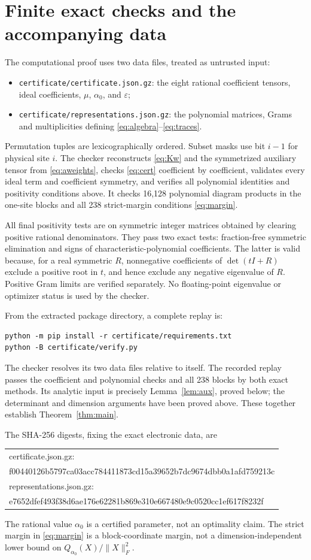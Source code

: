 \documentclass[10pt]{article}
\newcommand{\al}{\alpha_0}
\newcommand{\eps}{\varepsilon}
\begin{document}
\section{Finite exact checks and the accompanying data}
The computational proof uses two data files, treated as untrusted input:
\begin{itemize}
\item \texttt{certificate/certificate.json.gz}: the eight rational
coefficient tensors, ideal coefficients, $\mu$, $\al$, and $\eps$;
\item \texttt{certificate/representations.json.gz}: the polynomial matrices,
Grams and multiplicities defining \eqref{eq:algebra}--\eqref{eq:traces}.
\end{itemize}
Permutation tuples are lexicographically ordered. Subset masks use bit $i-1$
for physical site $i$. The checker reconstructs \eqref{eq:Kw} and the
symmetrized auxiliary tensor from \eqref{eq:aweights}, checks
\eqref{eq:cert} coefficient by coefficient, validates every ideal term and
coefficient symmetry, and verifies all polynomial identities and positivity
conditions above. It checks 16,128 polynomial diagram products in the
one-site blocks and all 238 strict-margin conditions \eqref{eq:margin}.

All final positivity tests are on symmetric integer matrices obtained by
clearing positive rational denominators. They pass two exact tests:
fraction-free symmetric elimination and signs of characteristic-polynomial
coefficients. The latter is valid because, for a real symmetric $R$,
nonnegative coefficients of $\det(tI+R)$ exclude a positive root in $t$,
and hence exclude any negative eigenvalue of $R$. Positive Gram limits are
verified separately. No floating-point eigenvalue or optimizer status is
used by the checker.

From the extracted package directory, a complete replay is:
\begin{verbatim}
python -m pip install -r certificate/requirements.txt
python -B certificate/verify.py
\end{verbatim}
The checker resolves its two data files relative to itself. The recorded
replay passes the coefficient and polynomial checks and all 238 blocks by
both exact methods. Its analytic input is precisely
Lemma~\ref{lem:aux}, proved below; the determinant and dimension arguments
have been proved above. These together establish Theorem~\ref{thm:main}.

The SHA-256 digests, fixing the exact electronic data, are
\begin{center}\small\ttfamily
\begin{tabular}{@{}l@{}}
certificate.json.gz:\\
f00440126b5797ca03acc784411873cd15a39652b7dc9674dbb0a1afd759213c\\[3pt]
representations.json.gz:\\
e7652dfef493f38d6ae176e62281b869e310e667480e9c0520cc1ef617f8232f
\end{tabular}
\end{center}
The rational value $\al$ is a certified parameter, not an optimality claim.
The strict margin in \eqref{eq:margin} is a block-coordinate margin, not a
dimension-independent lower bound on $Q_{\al}(X)/\|X\|_F^2$.
\end{document}
